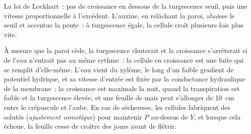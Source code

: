 \begin{omfigure}

{\small La loi de Lockhart~: pas de croissance en dessous de la
turgescence seuil, puis une vitesse proportionnelle à l'excédent.
L'auxine, en relâchant la paroi, abaisse le seuil et accentue la pente~:
à turgescence égale, la cellule croît plusieurs fois plus vite.}
\end{omfigure}

\begin{example}\label{ex:b2:plant-meristems:water}
À mesure que la paroi cède, la turgescence chuterait et la croissance
s'arrêterait si de l'eau n'entrait pas au même rythme~: la cellule en
croissance est une fuite qui se remplit d'elle-même. L'eau vient du
xylème, le long d'un faible gradient de potentiel hydrique, et sa
vitesse d'entrée est fixée par la conductance hydraulique de la
membrane~; la croissance est maximale la nuit, quand la transpiration
est faible et la turgescence élevée, et une feuille de maïs peut
s'allonger de \qty{10}{cm} entre le crépuscule et l'aube. En cas de
sécheresse, les cellules fabriquent des solutés (\emph{ajustement
osmotique}) pour maintenir $P$ au-dessus de $Y$, et lorsque cela
échoue, la feuille cesse de croître des jours avant de flétrir.
\end{example}

